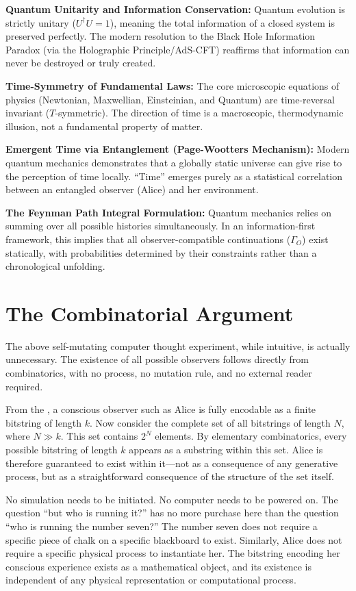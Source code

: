 \textbf{Quantum Unitarity and Information Conservation:} Quantum evolution is strictly unitary ($U^\dagger U = 1$), meaning the total information of a closed system is preserved perfectly. The modern resolution to the Black Hole Information Paradox (via the Holographic Principle/AdS-CFT) reaffirms that information can never be destroyed or truly created.

\textbf{Time-Symmetry of Fundamental Laws:} The core microscopic equations of physics (Newtonian, Maxwellian, Einsteinian, and Quantum) are time-reversal invariant ($T$-symmetric). The direction of time is a macroscopic, thermodynamic illusion, not a fundamental property of matter.

\textbf{Emergent Time via Entanglement (Page-Wootters Mechanism):} Modern quantum mechanics demonstrates that a globally static universe can give rise to the perception of time locally. ``Time'' emerges purely as a statistical correlation between an entangled observer (Alice) and her environment.

\textbf{The Feynman Path Integral Formulation:} Quantum mechanics relies on summing over all possible histories simultaneously. In an information-first framework, this implies that all observer-compatible continuations ($\Gamma_O$) exist statically, with probabilities determined by their constraints rather than a chronological unfolding.


\section{The Combinatorial Argument}

The above self-mutating computer thought experiment, while intuitive, is actually unnecessary. 
The existence of all possible observers follows directly from combinatorics, with no process, 
no mutation rule, and no external reader required.

From the , a conscious observer such 
as Alice is fully encodable as a finite bitstring of length $k$. Now consider the complete set 
of all bitstrings of length $N$, where $N \gg k$. This set contains $2^N$ elements. By elementary 
combinatorics, every possible bitstring of length $k$ appears as a substring within this set. 
Alice is therefore guaranteed to exist within it---not as a consequence of any generative process, 
but as a straightforward consequence of the structure of the set itself.

No simulation needs to be initiated. No computer needs to be powered on. The question ``but 
who is running it?'' has no more purchase here than the question ``who is running the number 
seven?'' The number seven does not require a specific piece of chalk on a specific blackboard 
to exist. Similarly, Alice does not require a specific physical process to instantiate her. 
The bitstring encoding her conscious experience exists as a mathematical object, and its 
existence is independent of any physical representation or computational process.

